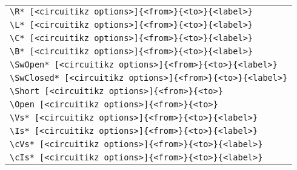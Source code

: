 \documentclass[a4paper,12pt]{article}
\begin{document}
\begin{center}
    \footnotesize
    \begin{tabular}{l}
        \hline
        \hline
        \texttt{\textbackslash R* [\textless circuitikz options\textgreater]\{\textless from\textgreater\}\{\textless to\textgreater\}\{\textless label\textgreater\}} \\
        \texttt{\textbackslash L* [\textless circuitikz options\textgreater]\{\textless from\textgreater\}\{\textless to\textgreater\}\{\textless label\textgreater\}} \\
        \texttt{\textbackslash C* [\textless circuitikz options\textgreater]\{\textless from\textgreater\}\{\textless to\textgreater\}\{\textless label\textgreater\}} \\
        \texttt{\textbackslash B* [\textless circuitikz options\textgreater]\{\textless from\textgreater\}\{\textless to\textgreater\}\{\textless label\textgreater\}} \\
        \hline
        \texttt{\textbackslash SwOpen* [\textless circuitikz options\textgreater]\{\textless from\textgreater\}\{\textless to\textgreater\}\{\textless label\textgreater\}}  \\
        \texttt{\textbackslash SwClosed* [\textless circuitikz options\textgreater]\{\textless from\textgreater\}\{\textless to\textgreater\}\{\textless label\textgreater\}} \\
        \hline
        \texttt{\textbackslash Short [\textless circuitikz options\textgreater]\{\textless from\textgreater\}\{\textless to\textgreater\}}  \\
        \texttt{\textbackslash Open  [\textless circuitikz options\textgreater]\{\textless from\textgreater\}\{\textless to\textgreater\}}  \\
        \hline
        \texttt{\textbackslash Vs* [\textless circuitikz options\textgreater]\{\textless from\textgreater\}\{\textless to\textgreater\}\{\textless label\textgreater\}}  \\
        \texttt{\textbackslash Is* [\textless circuitikz options\textgreater]\{\textless from\textgreater\}\{\textless to\textgreater\}\{\textless label\textgreater\}} \\
        \texttt{\textbackslash cVs* [\textless circuitikz options\textgreater]\{\textless from\textgreater\}\{\textless to\textgreater\}\{\textless label\textgreater\}}  \\
        \texttt{\textbackslash cIs* [\textless circuitikz options\textgreater]\{\textless from\textgreater\}\{\textless to\textgreater\}\{\textless label\textgreater\}}  \\

\end{tabular}
\end{center}
\end{document}
